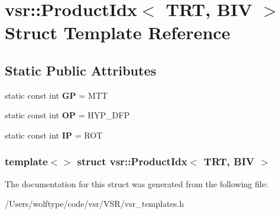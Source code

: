 \hypertarget{structvsr_1_1_product_idx_3_01_t_r_t_00_01_b_i_v_01_4}{\section{vsr\-:\-:Product\-Idx$<$ T\-R\-T, B\-I\-V $>$ Struct Template Reference}
\label{structvsr_1_1_product_idx_3_01_t_r_t_00_01_b_i_v_01_4}
}
\subsection*{Static Public Attributes}
\begin{DoxyCompactItemize}
\item 
\hypertarget{structvsr_1_1_product_idx_3_01_t_r_t_00_01_b_i_v_01_4_a89765e89df65fb6a9c9f3ad1a1471666}{static const int {\bfseries G\-P} = M\-T\-T}\label{structvsr_1_1_product_idx_3_01_t_r_t_00_01_b_i_v_01_4_a89765e89df65fb6a9c9f3ad1a1471666}

\item 
\hypertarget{structvsr_1_1_product_idx_3_01_t_r_t_00_01_b_i_v_01_4_a58c825ce37f5ddbf111fa49071d77ebf}{static const int {\bfseries O\-P} = H\-Y\-P\-\_\-\-D\-F\-P}\label{structvsr_1_1_product_idx_3_01_t_r_t_00_01_b_i_v_01_4_a58c825ce37f5ddbf111fa49071d77ebf}

\item 
\hypertarget{structvsr_1_1_product_idx_3_01_t_r_t_00_01_b_i_v_01_4_a79f70372f20563fb76090d8268f94bfb}{static const int {\bfseries I\-P} = R\-O\-T}\label{structvsr_1_1_product_idx_3_01_t_r_t_00_01_b_i_v_01_4_a79f70372f20563fb76090d8268f94bfb}

\end{DoxyCompactItemize}
\subsubsection*{template$<$$>$ struct vsr\-::\-Product\-Idx$<$ T\-R\-T, B\-I\-V $>$}



The documentation for this struct was generated from the following file\-:\begin{DoxyCompactItemize}
\item 
/\-Users/wolftype/code/vsr/\-V\-S\-R/vsr\-\_\-templates.\-h\end{DoxyCompactItemize}
